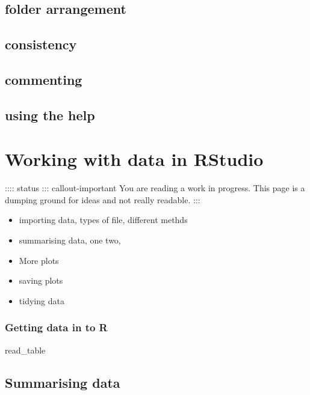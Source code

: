 \documentclass[
  letterpaper,
  DIV=11,
  numbers=noendperiod]{scrreprt}
\providecommand{\tightlist}{%
  \setlength{\itemsep}{0pt}\setlength{\parskip}{0pt}}\usepackage{longtable,booktabs,array}
\begin{document}
\hypertarget{folder-arrangement}{%
\section{folder arrangement}\label{folder-arrangement}}

\hypertarget{consistency}{%
\section{consistency}\label{consistency}}

\hypertarget{commenting}{%
\section{commenting}\label{commenting}}

\hypertarget{using-the-help}{%
\section{using the help}\label{using-the-help}}

\hypertarget{working-with-data-in-rstudio}{%
\chapter{Working with data in
RStudio}\label{working-with-data-in-rstudio}}

:::: status ::: callout-important You are reading a work in progress.
This page is a dumping ground for ideas and not really readable. :::

\begin{itemize}
\tightlist
\item
  importing data, types of file, different methds
\item
  summarising data, one two,
\item
  More plots
\item
  saving plots
\item
  tidying data
\end{itemize}

\hypertarget{getting-data-in-to-r}{%
\subsection{Getting data in to R}\label{getting-data-in-to-r}}

read\_table

\hypertarget{summarising-data}{%
\section{Summarising data}\label{summarising-data}}
\end{document}
